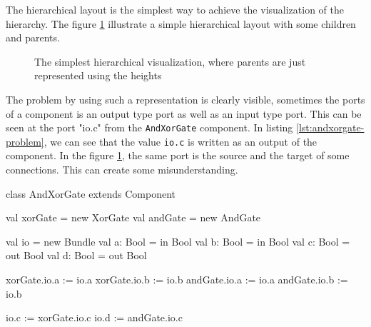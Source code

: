 The hierarchical layout is the simplest way to achieve the visualization of the
hierarchy. The figure \ref{fig:hierarchical-layout-simple} illustrate a simple
hierarchical layout with some children and parents.

\begin{figure}[H]
  \centering
  \caption[Simple hierarchical layout for diagram visualization]{The simplest
    hierarchical visualization, where parents are just represented using the heights}
  \label{fig:hierarchical-layout-simple}
\end{figure}

The problem by using such a representation is clearly visible, sometimes the
ports of a component is an output type port as well as an input type port.
This can be seen at the port "io.c" from the \texttt{AndXorGate} component. In
listing \ref{lst:andxorgate-problem}, we can see that the value \verb|io.c| is
written as an output of the component. In the figure
\ref{fig:hierarchical-layout-simple}, the same port is the source and the target
of some connections. This can create some misunderstanding.

\begin{listing}[H]
  \centering
\begin{scalacode}
class AndXorGate extends Component {

  val xorGate = new XorGate
  val andGate = new AndGate

  val io = new Bundle {
    val a: Bool = in Bool
    val b: Bool = in Bool
    val c: Bool = out Bool
    val d: Bool = out Bool
  }

  xorGate.io.a := io.a
  xorGate.io.b := io.b
  andGate.io.a := io.a
  andGate.io.b := io.b

  io.c := xorGate.io.c
  io.d := andGate.io.c
}
\end{scalacode}
  \caption[The AndXorGate component written with SpinalHDL]{The AndXorGate
component writtent with SpinalHDL. We can see that the ``c'' port is an output
of the components and in figure \ref{fig:hierarchical-layout-simple} the port is
shows as an input port and an output port.}
  \label{lst:andxorgate-problem}
\end{listing}

